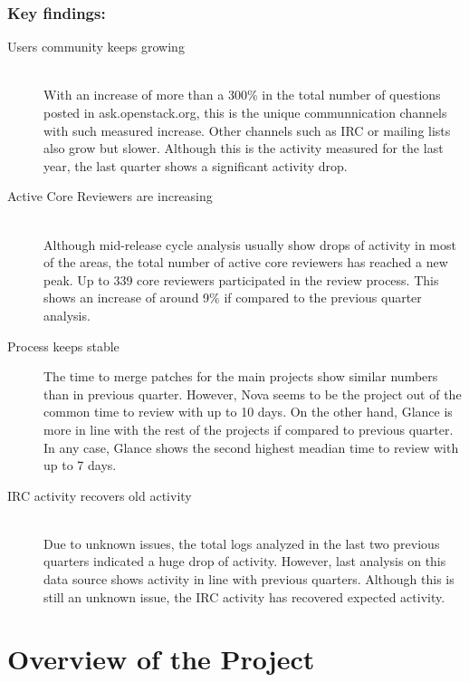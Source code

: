 \documentclass[a4wide,11pt]{report}
\begin{document}
\subsection*{Key findings:}
\begin{description}

\item[Users community keeps growing] \hfill \\
With an increase of more than a 300\% in the total number of questions
posted in ask.openstack.org, this is the unique communnication channels with
such measured increase. Other channels such as IRC or mailing lists
also grow but slower. Although this is the activity measured for the last year,
the last quarter shows a significant activity drop.

\item[Active Core Reviewers are increasing] \hfill \\
Although mid-release cycle analysis usually show drops of 
activity in most of the areas, the total number of active core reviewers
has reached a new peak. Up to 339 core reviewers participated in the 
review process. This shows an increase of around 9\% if compared
to the previous quarter analysis. 

\item[Process keeps stable]
The time to merge patches for the main projects show similar numbers
than in previous quarter. However, Nova seems to be the project
out of the common time to review with up to 10 days. On the other hand,
Glance is more in line with the rest of the projects if compared to previous
quarter. In any case, Glance shows the second highest meadian time to review
with up to 7 days. 


\item[IRC activity recovers old activity] \hfill \\
Due to unknown issues, the total logs analyzed in the last two previous
quarters indicated a huge drop of activity. However, last analysis on this
data source shows activity in line with previous quarters. Although this is
still an unknown issue, the IRC activity has recovered expected activity.



\end{description}

\setcounter{tocdepth}{4}
\setcounter{secnumdepth}{4}
\tableofcontents


\chapter{Overview of the Project}
\end{document}
